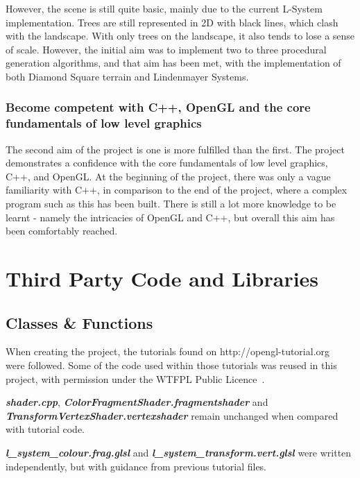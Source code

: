 \documentclass[a4paper,10pt]{report}
\begin{document}
However, the scene is still quite basic, mainly due to the current L-System implementation. Trees are still represented in 2D with black lines, which clash with the landscape. With only trees on the landscape, it also tends to lose a sense of scale. However, the initial aim was to implement two to three procedural generation algorithms, and that aim has been met, with the implementation of both Diamond Square terrain and Lindenmayer Systems. 

\subsection{Become competent with C++, OpenGL and the core fundamentals of low level graphics}

The second aim of the project is one is more fulfilled than the first. The project demonstrates a confidence with the core fundamentals of low level graphics, C++, and OpenGL. At the beginning of the project, there was only a vague familiarity with C++, in comparison to the end of the project, where a complex program such as this has been built.  There is still a lot more knowledge to be learnt - namely the intricacies of OpenGL and C++, but overall this aim has been comfortably reached.

    
\clearpage

\appendix

\chapter{Third Party Code and Libraries}

\section{Classes \& Functions}

When creating the project, the tutorials found on http://opengl-tutorial.org~\cite{opengl_tutorial} were followed. Some of the code used within those tutorials was reused in this project, with permission under the WTFPL Public Licence~\cite{wtfpl}. \medskip

\textit{\textbf{shader.cpp}}, \textit{\textbf{ColorFragmentShader.fragmentshader}} and \textit{\textbf{TransformVertexShader.vertexshader}} remain unchanged when compared with tutorial code. \medskip

\textit{\textbf{l\_system\_colour.frag.glsl}} and \textit{\textbf{l\_system\_transform.vert.glsl}} were written independently, but with guidance from previous tutorial files.\medskip
\end{document}
